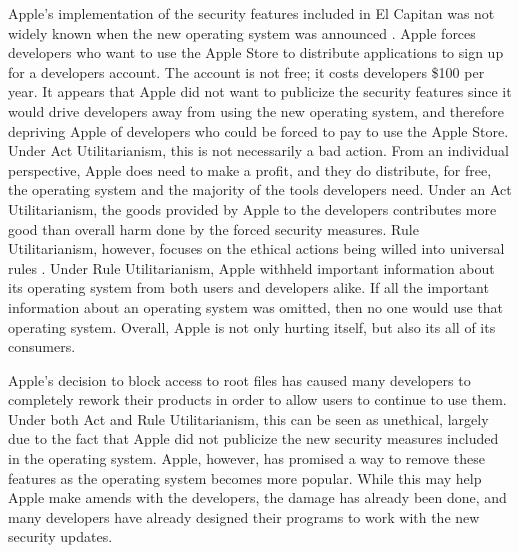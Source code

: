 \documentclass{paper}
\begin{document}
\begin{linenumbers}
Apple's implementation of the security features included in El Capitan was not widely known when the new operating system was announced \cite{sec}. Apple forces developers who want to use the Apple Store to distribute applications to sign up for a developers account. The account is not free; it costs developers \$100 per year. It appears that Apple did not want to publicize the security features since it would drive developers away from using the new operating system, and therefore depriving Apple of developers who could be forced to pay to use the Apple Store. Under Act Utilitarianism, this is not necessarily a bad action. From an individual perspective, Apple does need to make a profit, and they do distribute, for free, the operating system and the majority of the tools developers need. Under an Act Utilitarianism, the goods provided by Apple to the developers contributes more good than overall harm done by the forced security measures. Rule Utilitarianism, however, focuses on the ethical actions being willed into universal rules \cite[75]{Ethics}. Under Rule Utilitarianism, Apple withheld important information about its operating system from both users and developers alike. If all the important information about an operating system was omitted, then no one would use that operating system. Overall, Apple is not only hurting itself, but also its all of its consumers.


Apple's decision to block access to root files has caused many developers to completely rework their products in order to allow users to continue to use them. Under both Act and Rule Utilitarianism, this can be seen as unethical, largely due to the fact that Apple did not publicize the new security measures included in the operating system. Apple, however, has promised a way to remove these features as the operating system becomes more popular. While this may help Apple make amends with the developers, the damage has already been done, and many developers have already designed their programs to work with the new security updates.

\end{linenumbers}
\newpage

\printbibliography
\end{document}
